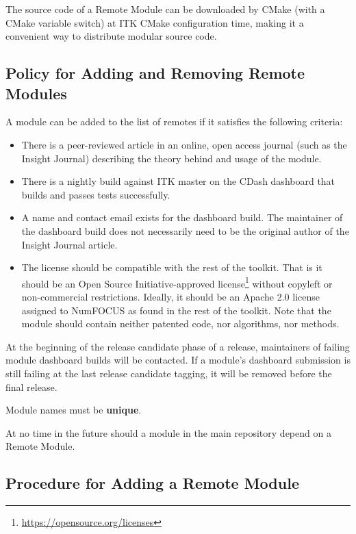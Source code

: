 The source code of a Remote Module can be downloaded by CMake (with a CMake
variable switch) at ITK CMake configuration time, making it a convenient way to
distribute modular source code.

\subsection{Policy for Adding and Removing Remote Modules}
\label{subsec:RemoteModuleAddRemovePolicy}

A module can be added to the list of remotes if it satisfies the following
criteria:
\begin{itemize}
\item There is a peer-reviewed article in an online, open access journal (such
as the Insight Journal) describing the theory behind and usage of the module.
\item There is a nightly build against ITK master on the CDash dashboard that
builds and passes tests successfully.
\item A name and contact email exists for the dashboard build. The maintainer
of the dashboard build does not necessarily need to be the original author of
the Insight Journal article.
\item The license should be compatible with the rest of the toolkit. That is
it should be an Open Source Initiative-approved
license\footnote{\url{https://opensource.org/licenses}} without copyleft or
non-commercial restrictions. Ideally, it should be an Apache 2.0 license
assigned to NumFOCUS as found in the rest of the toolkit. Note that the module
should contain neither patented code, nor algorithms, nor methods.
\end{itemize}

At the beginning of the release candidate phase of a release, maintainers of
failing module dashboard builds will be contacted. If a module's dashboard
submission is still failing at the last release candidate tagging, it will be
removed before the final release.

Module names must be \textbf{unique}.

At no time in the future should a module in the main repository depend on a
Remote Module.

\subsection{Procedure for Adding a Remote Module}
\label{subsec:ProcedureAddingRemoteModules}

